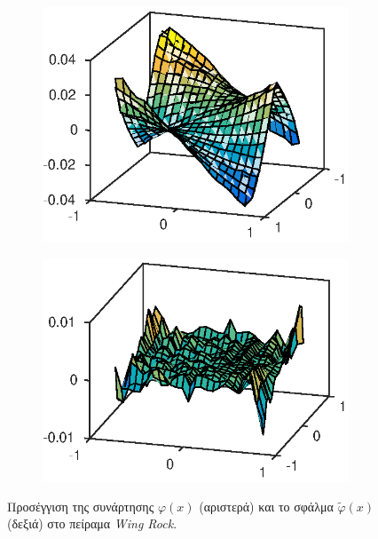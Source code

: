 \begin{figure}
	\begin{subfigure}{0.5\textwidth}
		\includegraphics{plots/experiments/wing_rock/f_approx_surf.eps}
	\end{subfigure}
	\begin{subfigure}{0.5\textwidth}
		\includegraphics{plots/experiments/wing_rock/f_approx_error.eps}
	\end{subfigure}
	\caption{Προσέγγιση της συνάρτησης $\varphi(x)$ (αριστερά) και το σφάλμα $\tilde{\varphi}(x)$ (δεξιά) στο πείραμα \textit{Wing Rock}.}
	\label{fig:wing_rock_phi_approximation}
\end{figure}

